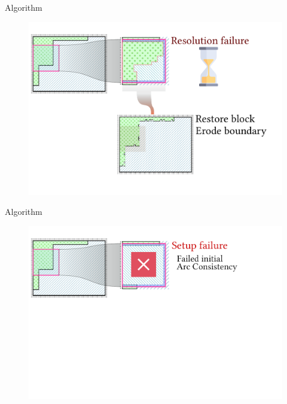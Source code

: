 \documentclass{beamer}
\begin{document}
  \begin{frame}[fragile]{Algorithm}
    \begin{figure}
      \includegraphics[width=\textwidth]{figs/poms_alg5_2.pdf}
    \end{figure}
  \end{frame}

  \begin{frame}[fragile]{Algorithm}
    \begin{figure}
      \includegraphics[width=\textwidth]{figs/poms_alg6_1.pdf}
    \end{figure}
  \end{frame}
\end{document}
